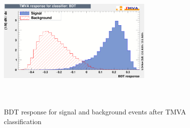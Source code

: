 \begin{figure}
  \centering
  \includegraphics[width=0.68\textwidth,height=7cm,keepaspectratio]{figures/bdt}
  \caption[Classifier BDT response]{BDT response for signal and background events after TMVA classification}
  \label{bdt}
\end{figure}


